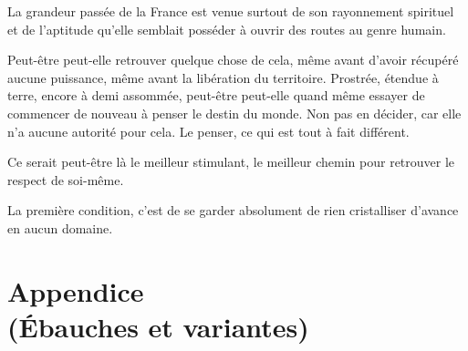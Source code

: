 \documentclass[french,twoside]{book} %
\begin{document}
La grandeur passée de la France est venue surtout de son rayonnement spirituel et de l'aptitude qu'elle semblait posséder à ouvrir des routes au genre humain.\par
Peut-être peut-elle retrouver quelque chose de cela, même avant d'avoir récupéré aucune puissance, même avant la libération du territoire. Prostrée, étendue à terre, encore à demi assommée, peut-être peut-elle quand même essayer de commencer de nouveau à penser le destin du monde. Non pas en décider, car elle n'a aucune autorité pour cela. Le penser, ce qui est tout à fait différent.\par
Ce serait peut-être là le meilleur stimulant, le meilleur chemin pour retrou­ver le respect de soi-même.\par
La première condition, c'est de se garder absolument de rien cristalliser d'avance en aucun domaine.\par

\backmatter \section[{Appendice, (Ébauches et variantes)}]{Appendice \\
(Ébauches et variantes)}\renewcommand{\leftmark}{Appendice \\
(Ébauches et variantes)}

\noindent \par
\par
\end{document}
